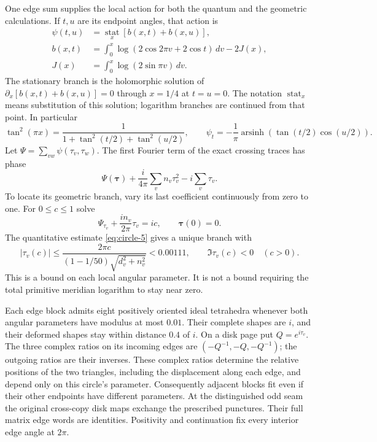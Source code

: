 One edge sum supplies the local action for both the quantum and the
geometric calculations. If \(t,u\) are its endpoint angles, that action
is \begin{equation}
 \begin{aligned}
 \psi(t,u)&=\operatorname*{stat}_{x}[b(x,t)+b(x,u)],\\
 b(x,t)&=\int_0^x\log(2\cos2\pi v+2\cos t)\,dv-2J(x),\\
 J(x)&=\int_0^x\log(2\sin\pi v)\,dv.
 \end{aligned}
 \label{eq:circle-11}
\end{equation} The stationary branch is the holomorphic solution of
$\partial_x[b(x,t)+b(x,u)]=0$ through $x=1/4$ at $t=u=0$.
The notation $\operatorname{stat}_x$ means substitution of this
solution; logarithm branches are continued from that point. In particular \begin{equation}
 \tan^2(\pi x)=\frac1{1+\tan^2(t/2)+\tan^2(u/2)},\qquad
 \psi_t=-\frac1\pi\operatorname{arsinh}
                       (\tan(t/2)\cos(u/2)).
 \label{eq:circle-12}
\end{equation} Let \(\Psi=\sum_{vw}\psi(\tau_v,\tau_w)\). The first Fourier term of
the exact crossing traces has phase \begin{equation}
 \Psi(\boldsymbol\tau)+\frac{i}{4\pi}\sum_v n_v\tau_v^2
                                      -i\sum_v\tau_v.
 \label{eq:circle-13}
\end{equation} To locate its geometric branch, vary its last coefficient
continuously from zero to one. For \(0\le c\le1\) solve \begin{equation}
 \Psi_{\tau_v}+\frac{i n_v}{2\pi}\tau_v=ic,
                         \qquad\boldsymbol\tau(0)=0.
 \label{eq:circle-14}
\end{equation} The quantitative estimate \eqref{eq:circle-5} gives a unique branch with \begin{equation}
 |\tau_v(c)|\le
 \frac{2\pi c}{(1-1/50)\sqrt{d_v^2+n_v^2}}<0.00111,
                    \qquad\Im\tau_v(c)<0\quad(c>0).
 \label{eq:circle-15}
\end{equation} This is a bound on each local angular parameter. It is not a bound
requiring the total primitive meridian logarithm to stay near zero.

Each edge block admits eight positively oriented ideal tetrahedra
whenever both angular parameters have modulus at most \(0.01\). Their
complete shapes are \(i\), and their deformed shapes stay within
distance \(0.4\) of \(i\). On a disk page put \(Q=e^{i\tau_v}\). The
three complex ratios on its incoming edges are \((-Q^{-1},-Q,-Q^{-1})\);
the outgoing ratios are their inverses. These complex ratios determine the relative positions of the two
triangles, including the displacement along each edge, and depend only on this circle's parameter. Consequently adjacent
blocks fit even if their other endpoints have different parameters. At
the distinguished odd seam the original cross-copy disk maps exchange
the prescribed punctures. Their full matrix edge words are identities.
Positivity and continuation fix every interior edge angle at \(2\pi\).

